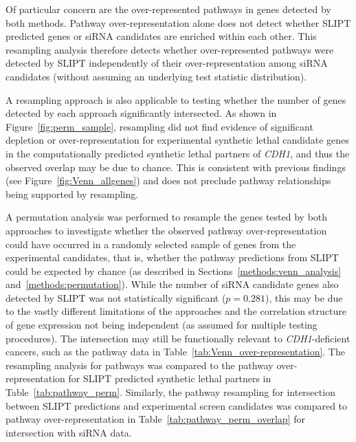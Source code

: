 Of particular concern are the over-represented pathways in genes detected by both methods. Pathway over-representation alone does not detect whether \gls{SLIPT} predicted genes or \gls{siRNA} candidates are enriched within each other. This resampling analysis therefore detects whether over-represented pathways were detected by \gls{SLIPT} independently of their over-representation among \gls{siRNA} candidates (without assuming an underlying test statistic distribution).

A resampling approach is also applicable to testing whether the number of genes detected by each approach significantly intersected. As shown in Figure~\ref{fig:perm_sample}, resampling did not find evidence of significant depletion or over-represent\-ation for experimental \gls{synthetic lethal} candidate genes in the computationally predicted \gls{synthetic lethal} partners of \textit{CDH1}, and thus the observed overlap may be due to chance. This is consistent with previous findings (see Figure~\ref{fig:Venn_allgenes}) and does not preclude pathway relationships being supported by resampling.

A permutation analysis was performed to resample the genes tested by both approaches to investigate whether the observed pathway over-represent\-ation could have occurred in a randomly selected sample of genes from the experimental candidates, that is, whether the pathway predictions from \gls{SLIPT} could be expected by chance (as described in Sections~\ref{methods:venn_analysis} and~\ref{methods:permutation}).
While the number of \gls{siRNA} candidate genes also detected by \gls{SLIPT} was not statistically significant ($p=0.281$), this may be due to the vastly different limitations of the approaches and the correlation structure of \gls{gene expression} not being independent (as assumed for multiple testing procedures). The  intersection may still be functionally relevant to \textit{CDH1}-deficient cancers, such as the pathway data in Table~\ref{tab:Venn_over-representation}. The resampling analysis for pathways was compared to the pathway over-represent\-ation for \gls{SLIPT} predicted \gls{synthetic lethal} partners in Table~\ref{tab:pathway_perm}. Similarly, the pathway resampling for intersection between \gls{SLIPT} predictions and experimental screen candidates was compared to pathway over-represent\-ation in Table~\ref{tab:pathway_perm_overlap} for intersection with \gls{siRNA} data.

